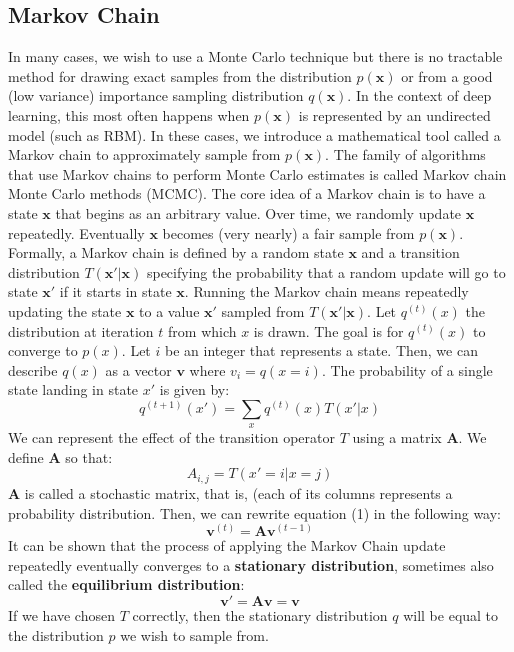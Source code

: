 \subsection{Markov Chain}
In many cases, we wish to use a Monte Carlo technique but there is no tractable
method for drawing exact samples from the distribution $p(\textbf{x})$ or from a good (low variance) importance sampling distribution $q(\textbf{x})$. In the context of deep learning, this most often happens when $p(\textbf{x})$ is represented by an undirected model (such as RBM). In these cases, we introduce a mathematical tool called a Markov chain to approximately sample from $p(\textbf{x})$. The family of algorithms that use Markov chains to perform Monte Carlo estimates is called Markov chain Monte Carlo methods (MCMC).\newline\newline
The core idea of a Markov chain is to have a state $\textbf{x}$ that begins as an arbitrary value. Over time, we randomly update $\textbf{x}$ repeatedly. Eventually $\textbf{x}$ becomes (very nearly) a fair sample from $p(\textbf{x})$.\newline\newline
Formally, a Markov chain is defined by a random state $\textbf{x}$ and a transition distribution $T(\textbf{x}'| \textbf{x})$ specifying the probability that a random update will go to state $\textbf{x}'$ if it starts in state $\textbf{x}$. Running the Markov chain means repeatedly updating the state $\textbf{x}$ to a value $\textbf{x}'$ sampled from $T(\textbf{x}' | \textbf{x})$.\newline\newline
Let $q^{(t)}(x)$ the distribution at iteration $t$ from which $x$ is drawn. The goal is for $q^{(t)}(x)$ to converge to $p(x)$.\newline\newline
Let $i$ be an integer that represents a state. Then, we can describe $q(x)$ as a vector $\textbf{v}$ where $v_i = q(x=i)$. The probability of a single state landing in state $x'$ is given by:
\begin{equation}
    q^{(t+1)}(x') = \sum_x q^{(t)}(x)T(x'|x)
\end{equation}
We can represent the effect of the transition operator $T$ using a matrix $\textbf{A}$. We define $\textbf{A}$ so that:
\[A_{i,j} = T(x' = i | x=j)\]
$\textbf{A}$ is called a stochastic matrix, that is, (each of its columns represents a probability distribution.\newline\newline
Then, we can rewrite equation (1) in the following way:
\[\textbf{v}^{(t)} = \textbf{A}\textbf{v}^{(t-1)}\]
It can be shown that the process of applying the Markov Chain update repeatedly eventually converges to a \textbf{stationary distribution}, sometimes also called the \textbf{equilibrium distribution}:
\[\textbf{v}' = \textbf{Av} = \textbf{v}\]
If we have chosen $T$ correctly, then the stationary distribution $q$ will be equal to the distribution $p$ we wish to sample from.

